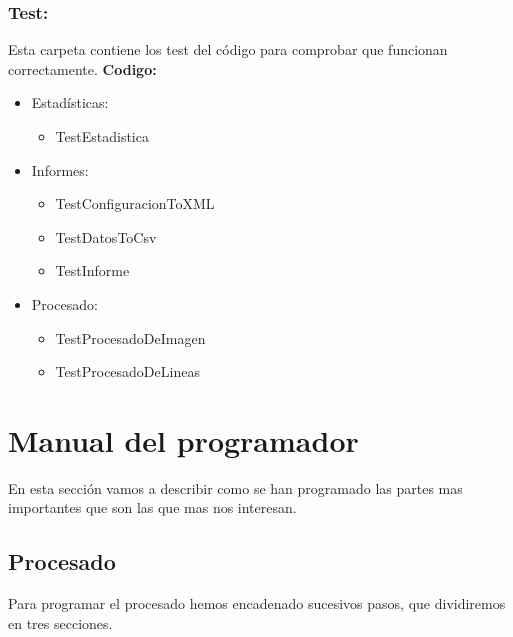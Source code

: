 \subsubsection{Test:}
Esta carpeta contiene los test del código para comprobar que funcionan correctamente.
\textbf{Codigo:}
\begin{itemize}
	\item Estadísticas:
		\begin{itemize}
			\item TestEstadistica
		\end{itemize}
	\item Informes:
		\begin{itemize}
			\item TestConfiguracionToXML
			\item TestDatosToCsv
			\item TestInforme
		\end{itemize}
	\item Procesado:
		\begin{itemize}
			\item TestProcesadoDeImagen
			\item TestProcesadoDeLineas
		\end{itemize}
\end{itemize}

\section{Manual del programador}
En esta sección vamos a describir como se han programado las partes mas importantes que son las que mas nos interesan.
\subsection{Procesado}
Para programar el procesado hemos encadenado sucesivos pasos, que dividiremos en tres secciones.


